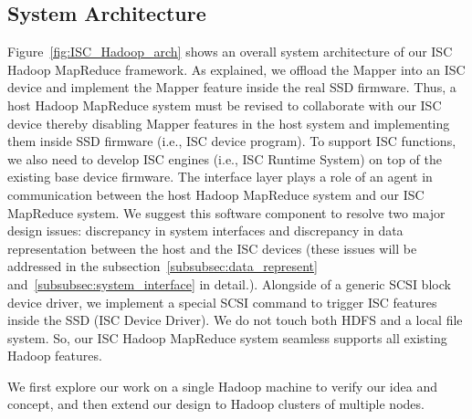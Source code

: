 \subsection{System Architecture}\label{sec:designSpace}
Figure~\ref{fig:ISC_Hadoop_arch} shows an overall system architecture of our ISC Hadoop MapReduce framework. As explained, we offload the Mapper into an ISC device and implement the Mapper feature inside the real SSD firmware. Thus, a host Hadoop MapReduce system must be revised to collaborate with our ISC device thereby disabling Mapper features in the host system and implementing them inside SSD firmware (i.e., ISC device program). To support ISC functions, we also need to develop ISC engines (i.e., ISC Runtime System) on top of the existing base device firmware. The interface layer plays a role of an agent in communication between the host Hadoop MapReduce system and our ISC MapReduce system. We suggest this software component to resolve two major design issues: discrepancy in system interfaces and discrepancy in data representation between the host and the ISC devices (these issues will be addressed in the subsection~\ref{subsubsec:data_represent} and~\ref{subsubsec:system_interface} in detail.).
Alongside of a generic SCSI block device driver, we implement a special SCSI command to trigger ISC features inside the SSD (ISC Device Driver). We do not touch both HDFS and a local file system. So, our ISC Hadoop MapReduce system seamless supports all existing Hadoop features.   

We first explore our work on a single Hadoop machine to verify our idea and concept, and then extend our design to Hadoop clusters of multiple nodes.


